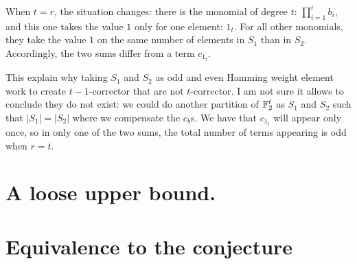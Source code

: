 \documentclass[11pt]{llncs}
\begin{document}
When $t=r$, the situation changes: there is the monomial of degree $t$: $\prod_{i=1}^t b_i$, and this one takes the value $1$ only for one element: $1_t$. For all other monomials, they take the value $1$ on the same number of elements in $S_1$ than in $S_2$.
Accordingly, the two sums differ from a term $c_{1_t}$.

This explain why taking $S_1$ and $S_2$ as odd and even Hamming weight element work to create $t-1$-corrector that are not $t$-corrector.
I am not sure it allows to conclude they do not exist: we could do another partition of $\mathbb{F}_2^t$ as $S_1$ and $S_2$ such that $|S_1|=|S_2|$ where we compensate the $c_b$s. We have that $c_{1_t}$ will appear only once, so in only one of the two sums, the total number of terms appearing is odd when $r=t$.

























\ifnum{}


\else


\fi

\appendix
{}
\section{A loose upper bound.}


\section{Equivalence to the conjecture}

\end{document}

